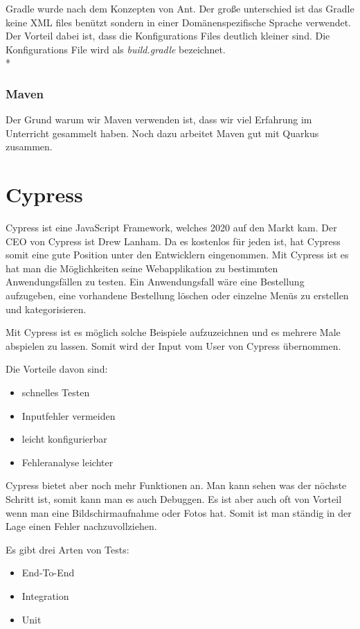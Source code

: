 Gradle wurde nach dem Konzepten von Ant. Der große unterschied ist das Gradle keine XML files benützt sondern in einer Domänenspezifische Sprache verwendet.
Der Vorteil dabei ist, dass die Konfigurations Files deutlich kleiner sind. Die Konfigurations File wird als \textit{build.gradle} bezeichnet. \\*  \cite{MavenVsAntVsGradle}

\subsubsection{Maven}

Der Grund warum wir Maven verwenden ist, dass wir viel Erfahrung im Unterricht gesammelt haben. Noch dazu arbeitet Maven gut mit Quarkus zusammen. 


\section{Cypress}
\author{Bozidar Spasenovic}
\cite{Cypress-Docu}
Cypress ist eine JavaScript Framework, welches 2020 auf den Markt kam. Der CEO von Cypress ist Drew Lanham.
Da es kostenlos für jeden ist, hat Cypress somit eine gute Position unter den Entwicklern eingenommen.
Mit Cypress ist es hat man die Möglichkeiten seine Webapplikation zu bestimmten Anwendungsfällen zu testen.
Ein Anwendungsfall wäre eine Bestellung aufzugeben, eine vorhandene Bestellung löschen oder einzelne Menüs zu erstellen und kategorisieren.


Mit Cypress ist es möglich solche Beispiele aufzuzeichnen und es mehrere Male abspielen zu lassen. Somit wird der Input vom User 
von Cypress übernommen. 

Die Vorteile davon sind:
\begin{itemize}
    \item schnelles Testen
    \item Inputfehler vermeiden
    \item leicht konfigurierbar
    \item Fehleranalyse leichter
\end{itemize}

Cypress bietet aber noch mehr Funktionen an. Man kann sehen was der nöchste Schritt ist, somit kann man es auch Debuggen.
Es ist aber auch oft von Vorteil wenn man eine Bildschirmaufnahme oder Fotos hat. Somit ist man ständig in der Lage einen 
Fehler nachzuvollziehen.

Es gibt drei Arten von Tests:

\begin{itemize}
    \item End-To-End
    \item Integration
    \item Unit
\end{itemize}



